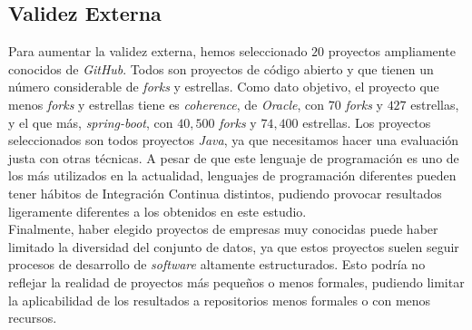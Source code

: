 \subsection{Validez Externa}
Para aumentar la validez externa, hemos seleccionado $20$ proyectos ampliamente conocidos de
\textit{GitHub}. Todos son proyectos de código abierto y que tienen un número considerable de
\textit{forks} y estrellas. Como dato objetivo, el proyecto que menos \textit{forks} y estrellas
tiene es \textit{coherence}, de \textit{Oracle}, con $70$ \textit{forks} y $427$ estrellas, y el
que más, \textit{spring-boot}, con $40,500$ \textit{forks} y $74,400$ estrellas. Los proyectos
seleccionados son todos proyectos \textit{Java}, ya que necesitamos hacer una evaluación justa
con otras técnicas. A pesar de que este lenguaje de programación es uno de los más utilizados 
en la actualidad, lenguajes de programación diferentes pueden tener hábitos de Integración
Continua distintos, pudiendo provocar resultados ligeramente diferentes a los obtenidos en este
estudio. \\

Finalmente, haber elegido proyectos de empresas muy conocidas puede haber limitado la
diversidad del conjunto de datos, ya que estos proyectos suelen seguir procesos de desarrollo de
\textit{software} altamente estructurados. Esto podría no reflejar la realidad de proyectos más
pequeños o menos formales, pudiendo limitar la aplicabilidad de los resultados a repositorios
menos formales o con menos recursos.

